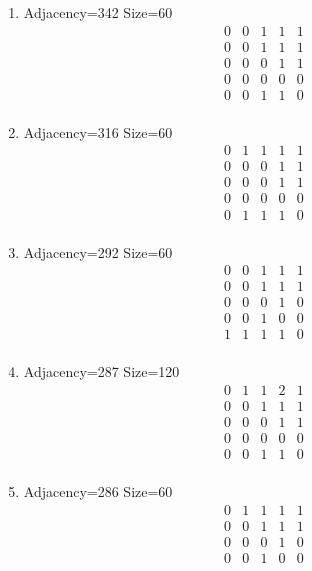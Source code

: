 \documentclass[12pt]{article}
\begin{document}
\begin{multicols}{3}
\begin{enumerate}
\item Adjacency=342 Size=60
\begin{equation*}
\begin{array}{ccccc}
0&0&1&1&1\\
0&0&1&1&1\\
0&0&0&1&1\\
0&0&0&0&0\\
0&0&1&1&0\\
\end{array}
\end{equation*}
\item Adjacency=316 Size=60
\begin{equation*}
\begin{array}{ccccc}
0&1&1&1&1\\
0&0&0&1&1\\
0&0&0&1&1\\
0&0&0&0&0\\
0&1&1&1&0\\
\end{array}
\end{equation*}
\item Adjacency=292 Size=60
\begin{equation*}
\begin{array}{ccccc}
0&0&1&1&1\\
0&0&1&1&1\\
0&0&0&1&0\\
0&0&1&0&0\\
1&1&1&1&0\\
\end{array}
\end{equation*}
\item Adjacency=287 Size=120
\begin{equation*}
\begin{array}{ccccc}
0&1&1&2&1\\
0&0&1&1&1\\
0&0&0&1&1\\
0&0&0&0&0\\
0&0&1&1&0\\
\end{array}
\end{equation*}
\item Adjacency=286 Size=60
\begin{equation*}
\begin{array}{ccccc}
0&1&1&1&1\\
0&0&1&1&1\\
0&0&0&1&0\\
0&0&1&0&0\\

\end{array}
\end{equation*}
\end{enumerate}
\end{multicols}
\end{document}
